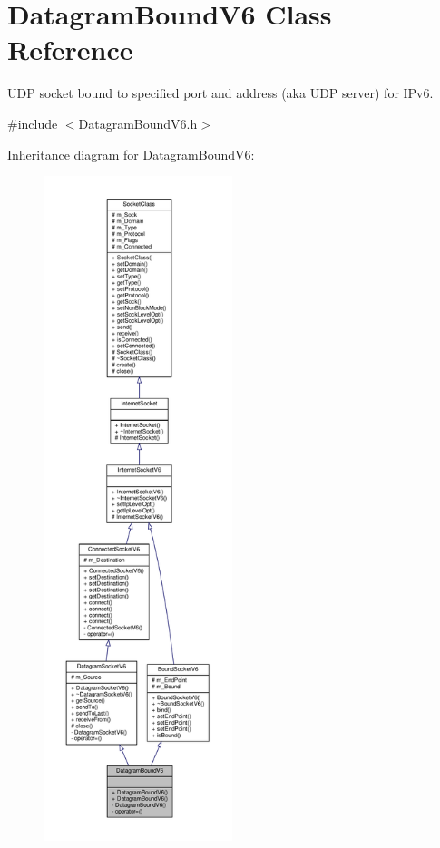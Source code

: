 \hypertarget{classDatagramBoundV6}{}\section{Datagram\+Bound\+V6 Class Reference}
\label{classDatagramBoundV6}


U\+DP socket bound to specified port and address (aka U\+DP server) for I\+Pv6.  




{\ttfamily \#include $<$Datagram\+Bound\+V6.\+h$>$}



Inheritance diagram for Datagram\+Bound\+V6\+:\nopagebreak
\begin{figure}[H]
\begin{center}
\leavevmode
\includegraphics[height=550pt]{classDatagramBoundV6__inherit__graph}
\end{center}
\end{figure}
